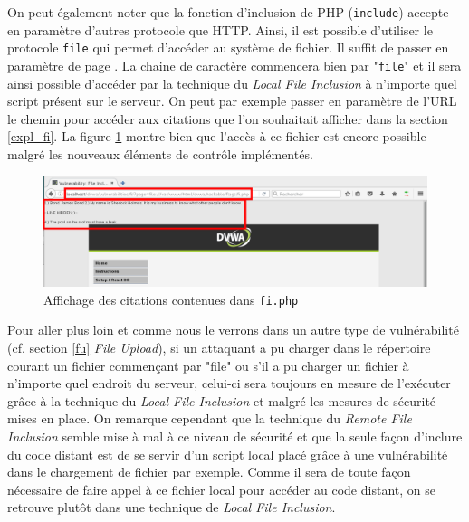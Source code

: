 On peut également noter que la fonction d'inclusion de PHP (\texttt{include}) accepte en paramètre d'autres protocole que HTTP. Ainsi, il est possible d'utiliser le protocole \texttt{file} qui permet d'accéder au système de fichier. Il suffit de passer en paramètre de page . La chaine de caractère commencera bien par "\texttt{file}" et il sera ainsi possible d'accéder par la technique du \textit{Local File Inclusion} à n'importe quel script présent sur le serveur. On peut par exemple passer en paramètre de l'URL le chemin  pour accéder aux citations que l'on souhaitait afficher dans la section \ref{expl_fi}. La figure \ref{fi_dvwa9} montre bien que l'accès à ce fichier est encore possible malgré les nouveaux éléments de contrôle implémentés.\\

\begin{figure}[!h]
\begin{center}
\includegraphics[scale=.4]{images/fi9.png}

\caption{Affichage des citations contenues dans \texttt{fi.php}}
\label{fi_dvwa9}
\end{center}
\end{figure}


Pour aller plus loin et comme nous le verrons dans un autre type de vulnérabilité (cf. section \ref{fu} \textit{File Upload}), si un attaquant a pu charger dans le répertoire courant un fichier commençant par "file" ou s'il a pu charger un fichier à n'importe quel endroit du serveur, celui-ci sera toujours en mesure de l'exécuter grâce à la technique du \textit{Local File Inclusion} et malgré les mesures de sécurité mises en place. On remarque cependant que la technique du \textit{Remote File Inclusion} semble mise à mal à ce niveau de sécurité et que la seule façon d'inclure du code distant est de se servir d'un script local placé grâce à une vulnérabilité dans le chargement de fichier par exemple. Comme il sera de toute façon nécessaire de faire appel à ce fichier local pour accéder au code distant, on se retrouve plutôt dans une technique de \textit{Local File Inclusion}. 

